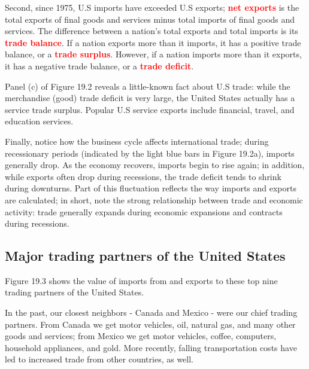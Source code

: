 \documentclass[11pt]{article} %
\begin{document}
Second, since 1975, U.S imports have exceeded U.S exports; \textbf{\textcolor{red}{net exports}} is the total exports of final goods and services minus total imports of final goods and services. The difference between a nation's total exports and total imports is its \textbf{\textcolor{red}{trade balance}}. If a nation exports more than it imports, it has a positive trade balance, or a \textbf{\textcolor{red}{trade surplus}}. However, if a nation imports more than it exports, it has a negative trade balance, or a \textbf{\textcolor{red}{trade deficit}}.

Panel (c) of Figure 19.2 reveals a little-known fact about U.S trade: while the merchandise (good) trade deficit is very large, the United States actually has a service trade surplus. Popular U.S service exports include financial, travel, and education services. 

Finally, notice how the business cycle affects international trade; during recessionary periods (indicated by the light blue bars in Figure 19.2a), imports generally drop. As the economy recovers, imports begin to rise again; in addition, while exports often drop during recessions, the trade deficit tends to shrink during downturns. Part of this fluctuation reflects the way imports and exports are calculated; in short, note the strong relationship between trade and economic activity: trade generally expands during economic expansions and contracts during recessions.

\subsection*{Major trading partners of the United States}
Figure 19.3 shows the value of imports from and exports to these top nine trading partners of the United States.

In the past, our closest neighbors - Canada and Mexico - were our chief trading partners. From Canada we get motor vehicles, oil, natural gas, and many other goods and services; from Mexico we get motor vehicles, coffee, computers, household appliances, and gold. More recently, falling transportation costs have led to increased trade from other countries, as well.
\end{document}
